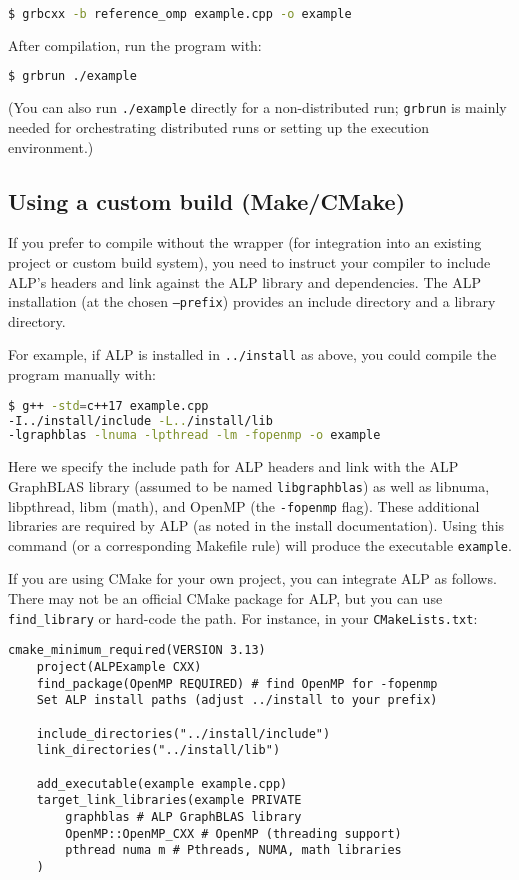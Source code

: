 \begin{lstlisting}[language=bash]
$ grbcxx -b reference_omp example.cpp -o example
\end{lstlisting}
After compilation, run the program with:
\begin{lstlisting}[language=bash]
$ grbrun ./example
\end{lstlisting}

(You can also run \texttt{./example} directly for a non-distributed run; \texttt{grbrun} is mainly needed for orchestrating distributed runs or setting up the execution environment.)

\subsection*{Using a custom build (Make/CMake)}

If you prefer to compile without the wrapper (for integration into an existing project or custom build system), you need to instruct your compiler to include ALP's headers and link against the ALP library and dependencies. The ALP installation (at the chosen \texttt{--prefix}) provides an include directory and a library directory.

For example, if ALP is installed in \texttt{../install} as above, you could compile the program manually with:
\begin{lstlisting}[language=bash]
$ g++ -std=c++17 example.cpp
-I../install/include -L../install/lib
-lgraphblas -lnuma -lpthread -lm -fopenmp -o example
\end{lstlisting}
Here we specify the include path for ALP headers and link with the ALP GraphBLAS library (assumed to be named \texttt{libgraphblas}) as well as libnuma, libpthread, libm (math), and OpenMP (the \texttt{-fopenmp} flag). These additional libraries are required by ALP (as noted in the install documentation). Using this command (or a corresponding Makefile rule) will produce the executable \texttt{example}.

If you are using CMake for your own project, you can integrate ALP as follows. There may not be an official CMake package for ALP, but you can use \texttt{find\_library} or hard-code the path. For instance, in your \texttt{CMakeLists.txt}:

\begin{lstlisting}[caption={Example CMakeLists.txt for an ALP project}]
    cmake_minimum_required(VERSION 3.13)
    project(ALPExample CXX)
    find_package(OpenMP REQUIRED) # find OpenMP for -fopenmp
    Set ALP install paths (adjust ../install to your prefix)
    
    include_directories("../install/include")
    link_directories("../install/lib")
    
    add_executable(example example.cpp)
    target_link_libraries(example PRIVATE
        graphblas # ALP GraphBLAS library
        OpenMP::OpenMP_CXX # OpenMP (threading support)
        pthread numa m # Pthreads, NUMA, math libraries
    )
\end{lstlisting}

